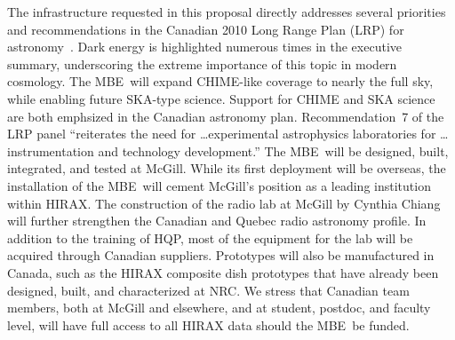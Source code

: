 \documentclass[letterpaper,11pt,preprint]{aastex}
\newcommand{\mbe}{{\rm MBE}}
\begin{document}
The infrastructure requested in this proposal directly addresses
several priorities and recommendations in the Canadian 2010 Long Range
Plan (LRP) for astronomy~\citep{lrp}.  Dark energy is highlighted
numerous times in the executive summary, underscoring the extreme
importance of this topic in modern cosmology.  The \mbe\ will expand
CHIME-like coverage to nearly the full sky, while enabling future
SKA-type science.  Support for CHIME and SKA science are both
emphsized in the Canadian astronomy plan.  Recommendation~7 of the LRP
panel ``reiterates the need for \ldots experimental astrophysics
laboratories for \ldots instrumentation and technology development.''
The \mbe\ will be designed, built, integrated, and tested at McGill.
While its first deployment will be overseas, the installation of the
\mbe\ will cement McGill's position as a leading institution within
HIRAX.  The construction of the radio lab at McGill by Cynthia Chiang
will further strengthen the Canadian and Quebec radio astronomy
profile.  In addition to the training of HQP, most of the equipment
for the lab will be acquired through Canadian suppliers.  Prototypes
will also be manufactured in Canada, such as the HIRAX composite dish
prototypes that have already been designed, built, and characterized
at NRC.  We stress that Canadian team members, both at McGill and
elsewhere, and at student, postdoc, and faculty level, will have full
access to all HIRAX data should the \mbe\ be funded.

\end{document}

